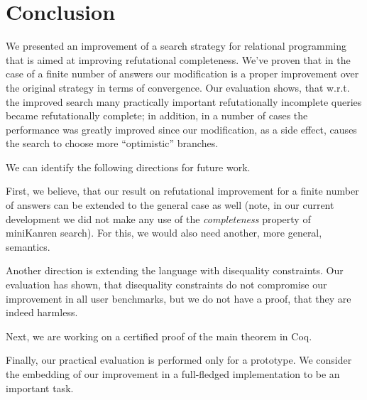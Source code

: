 \section{Conclusion}
\label{sec:conclusion}

We presented an improvement of a search strategy for relational programming that is aimed at
improving refutational completeness. We've proven that in the case of a finite number of 
answers our modification is a proper improvement over the original strategy in terms of convergence.
Our evaluation shows, that w.r.t. the improved search many practically important refutationally incomplete 
queries became refutationally complete; in addition, in a number of cases the performance was greatly 
improved since our modification, as a side effect, causes the search to choose more 
``optimistic'' branches.

We can identify the following directions for future work. 

First, we believe, that our result on refutational improvement for a finite number of answers 
can be extended to the general case as well (note, in our current development we did not make 
any use of the \emph{completeness} property of miniKanren search). For this, we would also need 
another, more general, semantics. 

Another direction is extending the language with disequality constraints. Our evaluation has 
shown, that disequality constraints do not compromise our improvement in all user benchmarks, 
but we do not have a proof, that they are indeed harmless.

Next, we are working on a certified proof of the main theorem in Coq.

Finally, our practical evaluation is performed only for a prototype. 
We consider the embedding of our improvement in a full-fledged implementation to be
an important task.
